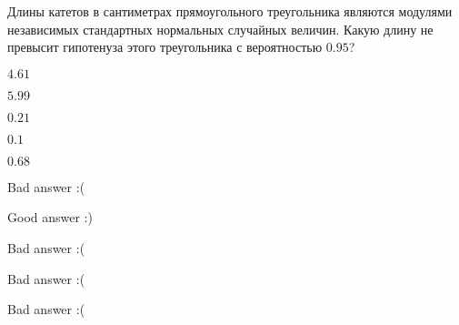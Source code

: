 
\begin{question}
Длины катетов в сантиметрах прямоугольного треугольника являются
модулями независимых стандартных нормальных случайных величин. Какую
длину не превысит гипотенуза этого треугольника с вероятностью \(0.95\)?
\begin{answerlist}
  \item \(4.61\)
  \item \(5.99\)
  \item \(0.21\)
  \item \(0.1\)
  \item \(0.68\)
\end{answerlist}
\end{question}

\begin{solution}
\begin{answerlist}
  \item Bad answer :(
  \item Good answer :)
  \item Bad answer :(
  \item Bad answer :(
  \item Bad answer :(
\end{answerlist}
\end{solution}

